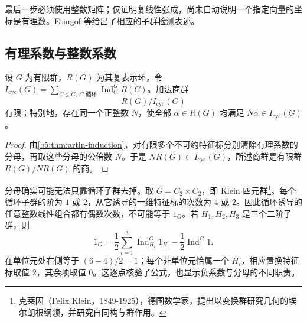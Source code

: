 最后一步必须使用整数矩阵；仅证明复线性张成，尚未自动说明一个指定向量的坐标是有理数。Etingof 等\cite[Theorem 5.26.1, Remark 5.26.2 and Corollary 5.26.3, pp. 141--142]{EtingofEtAl2011RepresentationTheory}给出了相应的子群检测表述。

\subsection{有理系数与整数系数}
\label{b5:subsec:0502:02}

\begin{corollary}\label{b5:cor:artin-finite-index}
	设 \(G\) 为有限群，\(R(G)\) 为其复表示环，令 \(I_{\mathrm{cyc}}(G)=\sum_{C\le G,\ C\text{ 循环}}\operatorname{Ind}_C^G R(C)\)。加法商群
	\[
		R(G)/I_{\mathrm{cyc}}(G)
	\]
	有限；特别地，存在同一个正整数 \(N\)，使全部 \(\alpha\in R(G)\) 均满足 \(N\alpha\in I_{\mathrm{cyc}}(G)\)。
\end{corollary}
\begin{proof}
	由\cref{b5:thm:artin-induction}，对有限多个不可约特征标分别清除有理系数的分母，再取这些分母的公倍数 \(N\)。于是 \(NR(G)\subset I_{\mathrm{cyc}}(G)\)，所述商群是有限群 \(R(G)/NR(G)\) 的商。
\end{proof}

分母确实可能无法只靠循环子群去掉。取 \(G=C_2\times C_2\)，即 Klein 四元群\footnote{克莱因（Felix Klein，1849-1925），德国数学家，提出以变换群研究几何的埃尔朗根纲领，并研究自同构与群作用。}。每个循环子群的阶为 \(1\) 或 \(2\)，从它诱导的一维特征标的次数为 \(4\) 或 \(2\)。因此循环诱导的任意整数线性组合都有偶数次数，不可能等于 \(1_G\)。若 \(H_1,H_2,H_3\) 是三个二阶子群，则
\begin{equation}\label{b5:eq:klein-artin-denominator}
	1_G=\frac12\sum_{i=1}^3\operatorname{Ind}_{H_i}^G1_{H_i} -\frac12\operatorname{Ind}_1^G1.
\end{equation}
在单位元处右侧等于 \((6-4)/2=1\)；每个非单位元恰属一个 \(H_i\)，相应置换特征标取值 \(2\)，其余项取值 \(0\)。这逐点核验了公式，也显示负系数与分母的不同职责。

